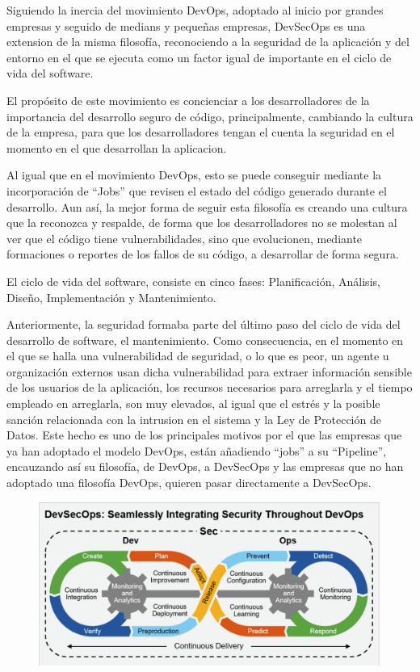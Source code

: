 \documentclass[12pt]{report} %
\begin{document}
Siguiendo la inercia del movimiento DevOps, adoptado al inicio por grandes
empresas y seguido de medians y pequeñas empresas, DevSecOps es una extension de
la misma filosofía, reconociendo a la seguridad de la aplicación y del entorno
en el que se ejecuta como un factor igual de importante en el ciclo de vida del
software.

El propósito de este movimiento es concienciar a los desarrolladores de la
importancia del desarrollo seguro de código, principalmente, cambiando la
cultura de la empresa, para que los desarrolladores tengan el cuenta la
seguridad en el momento en el que desarrollan la aplicacion.

Al igual que en el movimiento DevOps, esto se puede conseguir mediante la
incorporación de ``Jobs'' que revisen el estado del código generado durante el
desarrollo.  Aun así, la mejor forma de seguir esta filosofía es creando una
cultura que la reconozca y respalde, de forma que los desarrolladores no se
molestan al ver que el código tiene vulnerabilidades, sino que evolucionen,
mediante formaciones o reportes de los fallos de su código, a desarrollar de
forma segura.

El ciclo de vida del software, consiste en cinco fases: Planificación, Análisis,
Diseño, Implementación y Mantenimiento.


Anteriormente, la seguridad formaba parte del último paso del ciclo de vida del
desarrollo de software, el mantenimiento.  Como consecuencia, en el momento en
el que se halla una vulnerabilidad de seguridad, o lo que es peor, un agente u
organización externos usan dicha vulnerabilidad para extraer información
sensible de los usuarios de la aplicación, los recursos necesarios para
arreglarla y el tiempo empleado en arreglarla, son muy elevados, al igual que el
estrés y la posible sanción relacionada con la intrusion en el sistema y la Ley
de Protección de Datos.  Este hecho es uno de los principales motivos por el que
las empresas que ya han adoptado el modelo DevOps, están añadiendo ``jobs'' a su
``Pipeline'', encauzando así su filosofía, de DevOps, a DevSecOps y las empresas
que no han adoptado una filosofía DevOps, quieren pasar directamente a
DevSecOps.

\begin{figure} \includegraphics[width=\textwidth]{devsecops.png} \end{figure}
\end{document}
